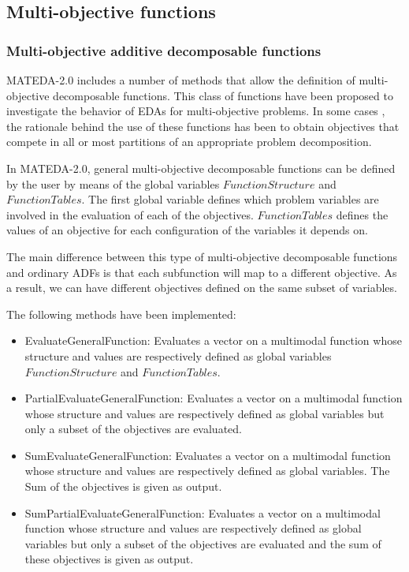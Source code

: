 \documentclass[a4paper]{article}
\begin{document}
\subsection{Multi-objective functions}

\subsubsection{Multi-objective additive decomposable functions}

 MATEDA-2.0 includes a number of methods that allow the
definition of multi-objective decomposable functions. This class of
functions have been proposed \cite{Khan:2003,Khan_et_al:2002,Pelikan_et_al:2005} to investigate the behavior
 of EDAs for multi-objective problems. In some cases
\cite{Khan:2003,Khan_et_al:2002,Pelikan_et_al:2005}, the rationale
behind the use of these functions has been to obtain objectives that
compete in all or most partitions of an appropriate problem
decomposition.

In MATEDA-2.0, general multi-objective decomposable functions can be
defined by the user by means of the global variables
$FunctionStructure$ and $FunctionTables$. The first global variable
defines which problem variables are involved in the evaluation of
each of the objectives. $FunctionTables$ defines the values of an
objective for each configuration of the variables it depends on.

The main difference between this type of multi-objective
decomposable functions and ordinary ADFs is that each subfunction
will map to a different objective. As a result, we can have
different objectives defined on the same subset of variables.

The following methods have been implemented:

 \begin{itemize}
   \item EvaluateGeneralFunction: Evaluates a vector on a multimodal function whose structure and
          values are respectively defined as global variables $FunctionStructure$ and $FunctionTables$.
   \item PartialEvaluateGeneralFunction:  Evaluates a vector on a multimodal function whose structure and
          values are respectively defined as global variables but only a subset of the objectives are evaluated.
   \item SumEvaluateGeneralFunction: Evaluates a vector on a multimodal function whose structure and
          values are respectively defined as global variables. The Sum of
          the objectives is given as output.
   \item SumPartialEvaluateGeneralFunction: Evaluates a vector on a multimodal function whose structure and
          values are respectively defined as global variables
          but only a subset of the objectives are evaluated and the sum of
          these objectives is given as output.
 \end{itemize}
\end{document}
